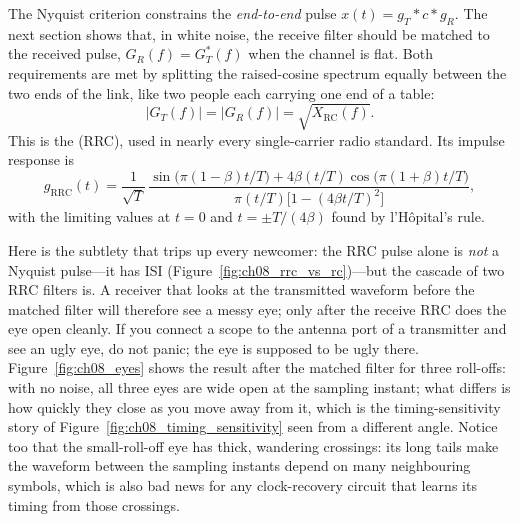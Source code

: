 The Nyquist criterion constrains the \emph{end-to-end} pulse $x(t)=g_T*c*g_R$. The next section
shows that, in white noise, the receive filter should be matched to the received pulse,
$G_R(f)=G_T^*(f)$ when the channel is flat. Both requirements are met by splitting the
raised-cosine spectrum equally between the two ends of the link, like two people each carrying
one end of a table:
\begin{equation}
|G_T(f)|=|G_R(f)|=\sqrt{X_{\mathrm{RC}}(f)}.
\end{equation}
This is the  (RRC), used in nearly every single-carrier radio
standard. Its impulse response is
\begin{equation}
g_{\mathrm{RRC}}(t)=\frac{1}{\sqrt T}\,
\frac{\sin\!\big(\pi(1-\beta)t/T\big)+4\beta(t/T)\cos\!\big(\pi(1+\beta)t/T\big)}
{\pi(t/T)\big[1-(4\beta t/T)^2\big]},
\label{eq:ch08:rrc}
\end{equation}
with the limiting values at $t=0$ and $t=\pm T/(4\beta)$ found by l'H\^opital's rule.


Here is the subtlety that trips up every newcomer: the RRC pulse alone is \emph{not} a Nyquist
pulse---it has ISI (Figure~\ref{fig:ch08_rrc_vs_rc})---but the cascade of two RRC filters is.
A receiver that looks at the transmitted waveform before the matched filter will therefore see
a messy eye; only after the receive RRC does the eye open cleanly. If you connect a scope to
the antenna port of a transmitter and see an ugly eye, do not panic; the eye is supposed to be
ugly there. Figure~\ref{fig:ch08_eyes} shows the result after the matched filter for three
roll-offs: with no noise, all three eyes are wide open at the sampling instant; what differs
is how quickly they close as you move away from it, which is the timing-sensitivity story of
Figure~\ref{fig:ch08_timing_sensitivity} seen from a different angle. Notice too that the
small-roll-off eye has thick, wandering crossings: its long tails make the waveform between
the sampling instants depend on many neighbouring symbols, which is also bad news for any
clock-recovery circuit that learns its timing from those crossings.


